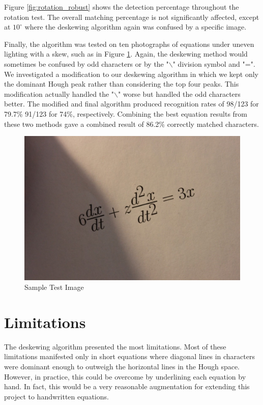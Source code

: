 \documentclass[journal]{IEEEtran}
\begin{document}
Figure \ref{fig:rotation_robust} shows the detection percentage throughout the rotation test. The overall matching percentage is not significantly affected, except at $10^\circ$ where the deskewing algorithm again was confused by a specific image.

Finally, the algorithm was tested on ten photographs of equations under uneven lighting with a skew, such as in Figure \ref{fig:test_img}. Again, the deskewing method would sometimes be confused by odd characters or by the "$\backslash$" division symbol and "=". We investigated a modification to our deskewing algorithm in which we kept only the dominant Hough peak rather than considering the top four peaks. This modification actually handled the "$\backslash$" worse but handled the odd characters better. The modified and final algorithm produced recognition rates of 98/123 for 79.7\% 91/123 for 74\%, respectively. Combining the best equation results from these two methods gave a combined result of 86.2\% correctly matched characters.

\begin{figure}[!t]
    \centering
    \includegraphics[width=\columnwidth]{test_img}
    \caption{Sample Test Image}
    \label{fig:test_img}
\end{figure}

\section{Limitations}
The deskewing algorithm presented the most limitations. Most of these limitations manifested only in short equations where diagonal lines in characters were dominant enough to outweigh the horizontal lines in the Hough space. However, in practice, this could be overcome by underlining each equation by hand. In fact, this would be a very reasonable augmentation for extending this project to handwritten equations.  
\end{document}
